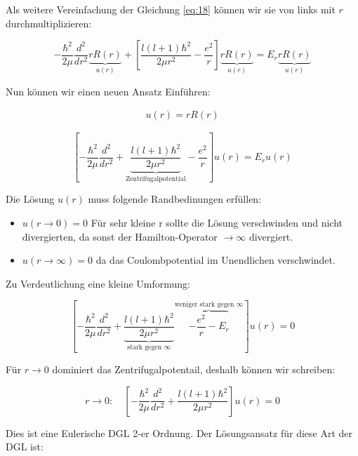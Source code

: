 Als weitere Vereinfachung der Gleichung \eqref{eq:18} können wir sie von links mit \(r\) durchmultiplizieren:

\begin{equation}
  \label{eq:19}
   - \frac{\hbar^2}{2\mu}\frac{d^2}{dr^2}\underbrace{r R(r)}_{u(r)} + \left[\frac{l(l+1)\hbar^2}{2\mu r^2}  - \frac{e^2}{r}\right] \underbrace{r R(r)}_{u(r)}   = E_r \underbrace{r R(r)}_{u(r)}
\end{equation}

Nun können wir einen neuen Ansatz Einführen:

\begin{align}
  \label{eq:30}
  u(r) = rR(r)
\end{align}


\begin{equation}
  \label{eq:20}
    \left[-\frac{\hbar^2}{2\mu}\frac{d^2}{dr^2} + \underbrace{\frac{l(l+1)\hbar^2}{2\mu r^2}}_{\text{Zentrifugalpotential}}  - \frac{e^2}{r}\right] u(r)   = E_r u(r)
\end{equation}

Die Lösung \(u(r)\) muss folgende Randbedinungen erfüllen:

\begin{itemize}
\item \(u(r \to 0)=0  \) Für sehr kleine r sollte die Lösung verschwinden und nicht divergierten, da sonst der Hamilton-Operator \(\to\infty\) divergiert.
\item  \(u(r \to \infty)=0  \) da das Coulombpotential im Unendlichen verschwindet.
\end{itemize}

Zu Verdeutlichung eine kleine Umformung:

\begin{equation}
  \label{eq:22}
   \left[-\frac{\hbar^2}{2\mu}\frac{d^2}{dr^2} + \underbrace{\frac{l(l+1)\hbar^2}{2\mu r^2}}_{\text{stark gegen }\infty}  \overbrace{- \frac{e^2}{r} - E_r}^{\text{weniger stark gegen }\infty}   \right] u(r)   = 0 
\end{equation}

Für \(r\to 0\) dominiert das Zentrifugalpotentail, deshalb können wir schreiben:

\begin{equation}
  \label{eq:21}
  r\to 0: \quad\left[-\frac{\hbar^2}{2\mu}\frac{d^2}{dr^2}+ \frac{l(l+1)\hbar^2}{2\mu r^2}\right] u(r) = 0
\end{equation}

Dies ist eine Eulerische DGL 2-er Ordnung. Der Lösungsansatz für diese Art der DGL ist:

